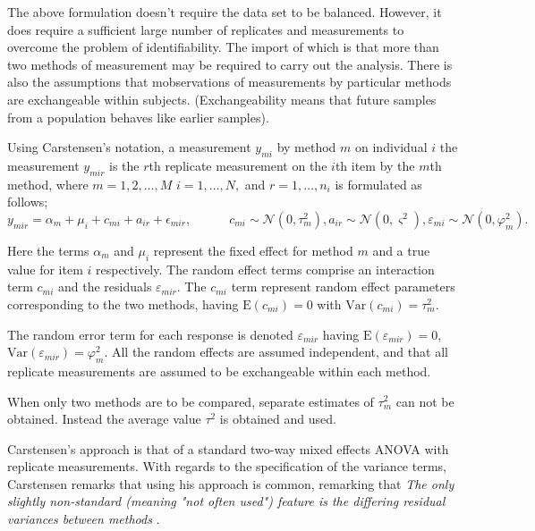 \documentclass[12pt, a4paper]{report}
\theoremstyle{plain}
\theoremstyle{definition}
\theoremstyle{remark}
\begin{document}
	The above formulation doesn't require the data set to be balanced.
	However, it does require a sufficient large number of replicates
	and measurements to overcome the problem of identifiability. The
	import of which is that more than two methods of measurement may
	be required to carry out the analysis. There is also the
	assumptions that mobservations of measurements by particular
	methods are exchangeable within subjects. (Exchangeability means
	that future samples from a population behaves like earlier
	samples).
	
	Using Carstensen's notation, a measurement $y_{mi}$ by method $m$ on individual $i$ the measurement $y_{mir} $ is the $r$th replicate measurement on the $i$th item by the $m$th method, where $m=1,2,\ldots,M$ $i=1,\ldots,N,$ and $r = 1,\ldots,n_i$ is formulated as follows;
	\begin{equation}
	y_{mir}  = \alpha_{m} + \mu_{i} + c_{mi} + a_{ir} + \epsilon_{mir}, \qquad \quad c_{mi} \sim \mathcal{N}(0,\tau^{2}_{m}) , a_{ir} \sim \mathcal{N}(0,\varsigma^{2}),  \varepsilon_{mi} \sim \mathcal{N}(0,\varphi^{2}_{m}) .
	\end{equation}
	
	Here the terms $\alpha_{m}$ and $\mu_{i}$ represent the fixed effect for method $m$ and a true value for item $i$ respectively. The random effect terms comprise an interaction term $c_{mi}$ and the residuals $\varepsilon_{mir}$.
	The $c_{mi}$ term represent random effect parameters corresponding to the two methods, having $\mathrm{E}(c_{mi})= 0$ with $\mathrm{Var}(c_{mi})=\tau^2_m$.  
	
	
	The random error term for each response is denoted $\varepsilon_{mir}$ having $\mathrm{E}(\varepsilon_{mir})=0$, $\mathrm{Var}(\varepsilon_{mir})=\varphi^2_m$. All the random effects are assumed independent, and that all replicate measurements are assumed to be exchangeable within each method.
	
	
	When only two methods are to be compared, separate estimates of $\tau^2_m$ can not be obtained. Instead the average value $\tau^2$ is obtained and used.
	
	
	Carstensen's approach is that of a standard two-way mixed effects ANOVA with replicate measurements. With regards to the specification of the variance terms, Carstensen remarks that using his approach is common, remarking that \emph{
		The only slightly non-standard (meaning "not often used") feature is the differing residual variances between methods }\citep{BXC2010}.
	
\end{document}
